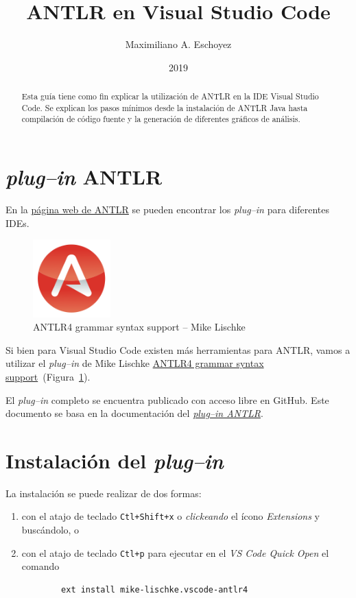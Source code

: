 \documentclass[a5paper,10pt]{article}
\author{Maximiliano A. Eschoyez}
\title{ANTLR en Visual Studio Code}
\date{2019}
\begin{document}
\maketitle


\begin{abstract}
	Esta guía tiene como fin explicar la utilización de ANTLR en la IDE Visual Studio Code.  Se explican los pasos mínimos desde la instalación de ANTLR Java hasta compilación de código fuente y la generación de diferentes gráficos de análisis.
\end{abstract}

\section{\emph{plug--in} ANTLR}
\label{intro}

En la \href{https://www.antlr.org/tools.html}{página web de ANTLR} se pueden encontrar los \emph{plug--in} para diferentes IDEs.

\begin{figure}[b]
	\centering
	\includegraphics[width=3cm]{img/IconoANTLRvscode}
	\caption{ANTLR4 grammar syntax support -- Mike Lischke}
	\label{icono}
\end{figure}

Si bien para Visual Studio Code existen más herramientas para ANTLR, vamos a utilizar el \emph{plug--in} de Mike Lischke \href{https://marketplace.visualstudio.com/items?itemName=mike-lischke.vscode-antlr4}{ANTLR4 grammar syntax support}~(Figura~\ref{icono}).

El \emph{plug--in} completo se encuentra publicado con acceso libre en GitHub.  Este documento se basa en la documentación del \href{https://github.com/mike-lischke/vscode-antlr4/tree/master/doc}{\emph{plug--in ANTLR}}.



\section{Instalación del \emph{plug--in}}
\label{instalacion}

La instalación se puede realizar de dos formas:
\begin{enumerate}
	\item con el atajo de teclado \verb|Ctl+Shift+x| o \emph{clickeando} el ícono \emph{Extensions} y buscándolo, o
    \item con el atajo de teclado \verb|Ctl+p| para ejecutar en el \emph{VS Code Quick Open} el comando
    \begin{verbatim}
		ext install mike-lischke.vscode-antlr4
	\end{verbatim}
\end{enumerate}
\end{document}
